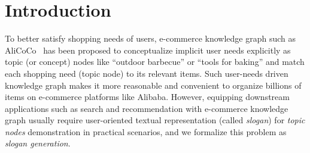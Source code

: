\section{Introduction}
\label{sec:introduction}

To better satisfy shopping needs of users,
e-commerce knowledge graph such as AliCoCo~\cite{luo2020alicoco} has been proposed to  conceptualize implicit user needs explicitly as topic (or concept) nodes like  ``outdoor barbecue'' or ``tools for baking'' and match each shopping need (topic node) to its relevant items.
Such user-needs driven knowledge graph makes it more reasonable and convenient to organize billions of items on e-commerce platforms like Alibaba. 
However, equipping downstream applications such as search and recommendation with e-commerce knowledge graph usually require user-oriented textual representation
(called \emph{slogan})  for \emph{topic nodes} demonstration in practical scenarios, 
and we formalize this problem as \emph{slogan generation}.

%
%
%
%


